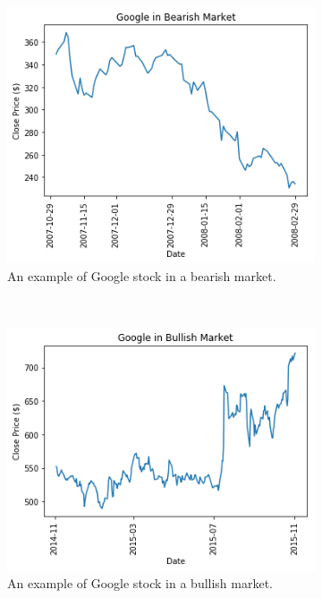 \documentclass[12pt]{article}
\begin{document}
\begin{figure}[t!]
	\centering
	\begin{subfigure}[t]{0.3\textwidth}
		\centering
		\includegraphics[width=\linewidth]{googBear.png}
		\caption{An example of Google stock in a bearish market.}
	\end{subfigure}%
	~ 
	\begin{subfigure}[t]{0.3\textwidth}
		\centering
		\includegraphics[width=\linewidth]{googBull.png}
		\caption{An example of Google stock in a bullish market.}
	\end{subfigure}
	~
	\begin{subfigure}[t]{0.3\textwidth}

\end{subfigure}
\end{figure}
\end{document}
